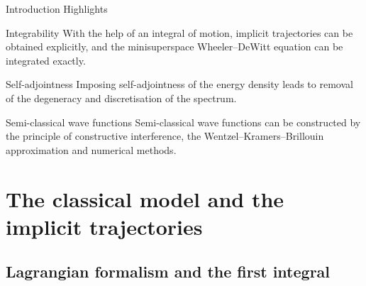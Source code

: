 \documentclass[8pt]{beamer}
\begin{document}
\begin{frame}%
{Introduction}%
{Highlights}
\begin{block}{Integrability}
With the help of an integral of motion, implicit trajectories can be obtained 
explicitly, and the minisuperspace Wheeler--DeWitt equation can be integrated 
exactly.
\end{block}

\begin{block}{Self-adjointness}
Imposing self-adjointness of the energy density leads to removal of the degeneracy 
and discretisation of the spectrum.
\end{block}

\begin{block}{Semi-classical wave functions}
Semi-classical wave functions can be constructed by the principle of
constructive interference, the Wentzel--Kramers--Brillouin approximation and
numerical methods.
\end{block}

\end{frame}

\section{The classical model and the implicit trajectories}

\subsection{Lagrangian formalism and the first integral}
\end{document}
